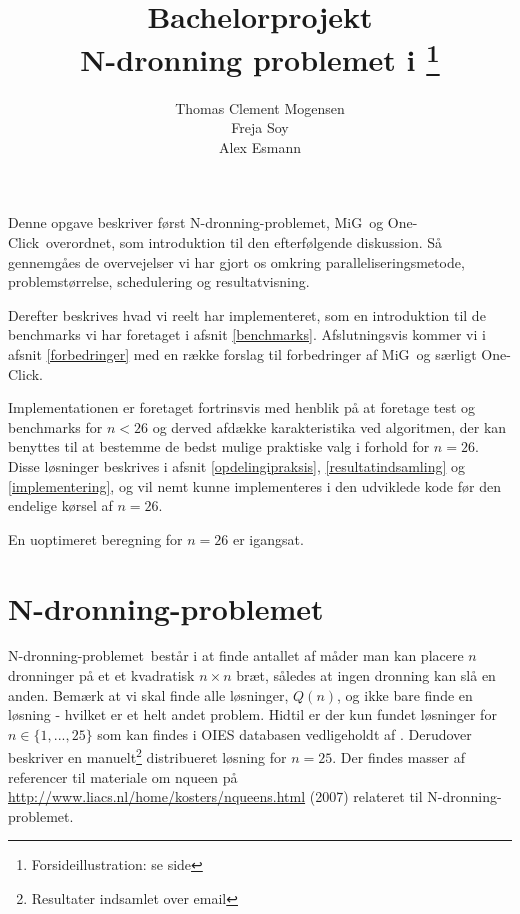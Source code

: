 \documentclass[draft,a4paper,11pt]{article}
\title{Bachelorprojekt\\N-dronning problemet i \mig\footnote{Forsideillustration: se side \pageref{fig:action}}}
\author{Thomas Clement Mogensen \\ Freja Soy \\ Alex Esmann}
\newcommand{\mig}{MiG}
\newcommand{\oc}{One-Click}
\newcommand{\nq}{N-dronning-problemet}
\renewcommand{\thepage}{\roman{page}}
\begin{document}
\maketitle
\tableofcontents
\listoffixmes
\newpage

\renewcommand{\thepage}{\arabic{page}}
\pagestyle{fancy}                              %
\fancyhead[R]{\thepage\ af \pageref{LastPage}} %
\fancyhead[L]{\nq\ i \mig}              %
\fancyfoot[C]{}                                %
\setcounter{page}{1}

\abstract
Denne opgave beskriver først \nq, \mig\ og \oc\ overordnet, som introduktion til den efterfølgende diskussion. Så gennemgåes de overvejelser vi har gjort os omkring paralleliseringsmetode, problemstørrelse, schedulering og resultatvisning. 

Derefter beskrives hvad vi reelt har implementeret, som en introduktion til de benchmarks vi har foretaget i afsnit \ref{benchmarks}. 
Afslutningsvis kommer vi i afsnit \ref{forbedringer} med en række forslag til forbedringer af \mig\ og særligt \oc.

Implementationen er foretaget fortrinsvis med henblik på at foretage test og benchmarks for $n<26$ og derved afdække karakteristika ved algoritmen, der kan benyttes til at bestemme de bedst mulige praktiske valg i forhold for $n=26$. Disse løsninger beskrives i afsnit \ref{opdelingipraksis}, \ref{resultatindsamling} og \ref{implementering}, og vil nemt kunne implementeres i den udviklede kode før den endelige kørsel af $n=26$. 

En uoptimeret beregning for $n=26$ er igangsat.


\section{\nq}\label{nqueenproblemet}

\nq\ består i at finde antallet af måder man kan placere $n$ dronninger på et et kvadratisk $n \times n$ bræt, således at ingen dronning kan slå en anden. Bemærk at vi skal finde alle løsninger, $Q(n)$, og ikke bare finde en løsning - hvilket er et helt andet problem. Hidtil er der kun fundet løsninger for $n \in \{1,...,25\}$ som kan findes i OIES databasen vedligeholdt af \citep{sekvenser}. Derudover beskriver \cite{etsi} en manuelt\footnote{Resultater indsamlet over email} distribueret løsning for $n=25$. Der findes masser af referencer til materiale om nqueen på \url{http://www.liacs.nl/home/kosters/nqueens.html} (2007) relateret til \nq. 
\end{document}
